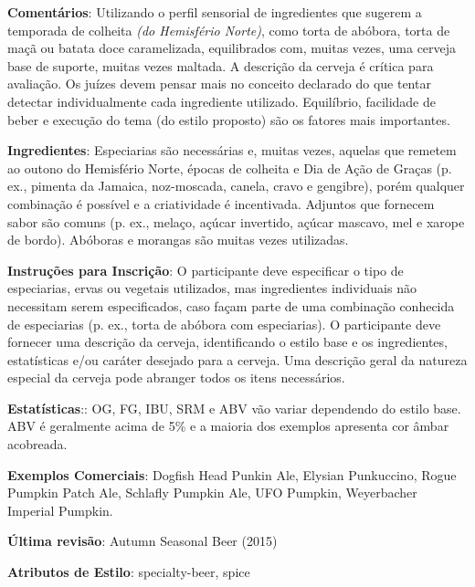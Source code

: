 \textbf{Comentários}: Utilizando o perfil sensorial de ingredientes que sugerem a temporada de colheita \textit{(do Hemisfério Norte)}, como torta de abóbora, torta de maçã ou batata doce caramelizada, equilibrados com, muitas vezes, uma cerveja base de suporte, muitas vezes maltada. A descrição da cerveja é crítica para avaliação. Os juízes devem pensar mais no conceito declarado do que tentar detectar individualmente cada ingrediente utilizado. Equilíbrio, facilidade de beber e execução do tema (do estilo proposto) são os fatores mais importantes.

\textbf{Ingredientes}: Especiarias são necessárias e, muitas vezes, aquelas que remetem ao outono do Hemisfério Norte, épocas de colheita e Dia de Ação de Graças (p. ex., pimenta da Jamaica, noz-moscada, canela, cravo e gengibre), porém qualquer combinação é possível e a criatividade é incentivada. Adjuntos que fornecem sabor são comuns (p. ex., melaço, açúcar invertido, açúcar mascavo, mel e xarope de bordo). Abóboras e morangas são muitas vezes utilizadas.

\textbf{Instruções para Inscrição}: O participante deve especificar o tipo de especiarias, ervas ou vegetais utilizados, mas ingredientes individuais não necessitam serem especificados, caso façam parte de uma combinação conhecida de especiarias (p. ex., torta de abóbora com especiarias). O participante deve fornecer uma descrição da cerveja, identificando o estilo base e os ingredientes, estatísticas e/ou caráter desejado para a cerveja. Uma descrição geral da natureza especial da cerveja pode abranger todos os itens necessários.

\textbf{Estatísticas}:: OG, FG, IBU, SRM e ABV vão variar dependendo do estilo base. ABV é geralmente acima de 5\% e a maioria dos exemplos apresenta cor âmbar acobreada.

\textbf{Exemplos Comerciais}: Dogfish Head Punkin Ale, Elysian Punkuccino, Rogue Pumpkin Patch Ale, Schlafly Pumpkin Ale, UFO Pumpkin, Weyerbacher Imperial Pumpkin.

\textbf{Última revisão}: Autumn Seasonal Beer (2015)

\textbf{Atributos de Estilo}: specialty-beer, spice
